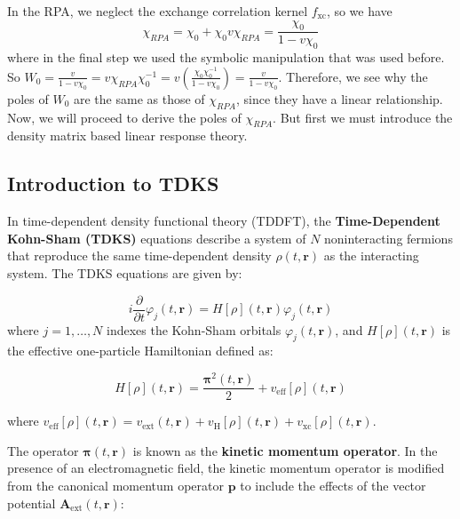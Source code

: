 \documentclass[12pt]{article}
\begin{document}
In the RPA, we neglect the exchange correlation kernel $f_{\text{xc}}$, so we have
\begin{equation}
    \chi_{RPA} = \chi_0 + \chi_0 v \chi_{RPA} = \frac{\chi_0}{1 - v \chi_0}
\end{equation}
where in the final step we used the symbolic manipulation that was used before. So $W_0 = \frac{v}{1 - v \chi_0} = v\chi_{RPA}\chi_0^{-1} = v\left(\frac{\chi_0 \chi_0^{-1}}{1 - v \chi_0}\right) = \frac{v}{1 - v \chi_0}$. Therefore, we see why the poles of $W_0$ are the same as those of $\chi_{RPA}$, since they have a linear relationship. Now, we will proceed to derive the poles of $\chi_{RPA}$. But first we must introduce the density matrix based linear response theory.

\subsection{Introduction to TDKS}


In time-dependent density functional theory (TDDFT), the \textbf{Time-Dependent Kohn-Sham (TDKS)} equations describe a system of $N$ noninteracting fermions that reproduce the same time-dependent density $\rho(t, \mathbf{r})$ as the interacting system. The TDKS equations are given by:

\begin{equation}
i \frac{\partial}{\partial t} \varphi_{j}(t, \mathbf{r}) = H[\rho](t, \mathbf{r}) \varphi_{j}(t, \mathbf{r}) \label{eq:TDKS}
\end{equation}
where \( j = 1, \ldots, N \) indexes the Kohn-Sham orbitals \( \varphi_{j}(t, \mathbf{r}) \), and \( H[\rho](t, \mathbf{r}) \) is the effective one-particle Hamiltonian defined as:

\begin{equation}
H[\rho](t, \mathbf{r}) = \frac{\boldsymbol{\pi}^2(t, \mathbf{r})}{2} + v_{\text{eff}}[\rho](t, \mathbf{r}) \label{eq:HKohnSham}
\end{equation}

where $v_{\text{eff}}[\rho](t, \mathbf{r}) = v_{\text{ext}}(t, \mathbf{r}) + v_{\text{H}}[\rho](t, \mathbf{r}) + v_{\text{xc}}[\rho](t, \mathbf{r})$.


The operator \( \boldsymbol{\pi}(t, \mathbf{r}) \) is known as the \textbf{kinetic momentum operator}. In the presence of an electromagnetic field, the kinetic momentum operator is modified from the canonical momentum operator \( \mathbf{p} \) to include the effects of the vector potential \( \mathbf{A}_{\text{ext}}(t, \mathbf{r}) \):
\end{document}
